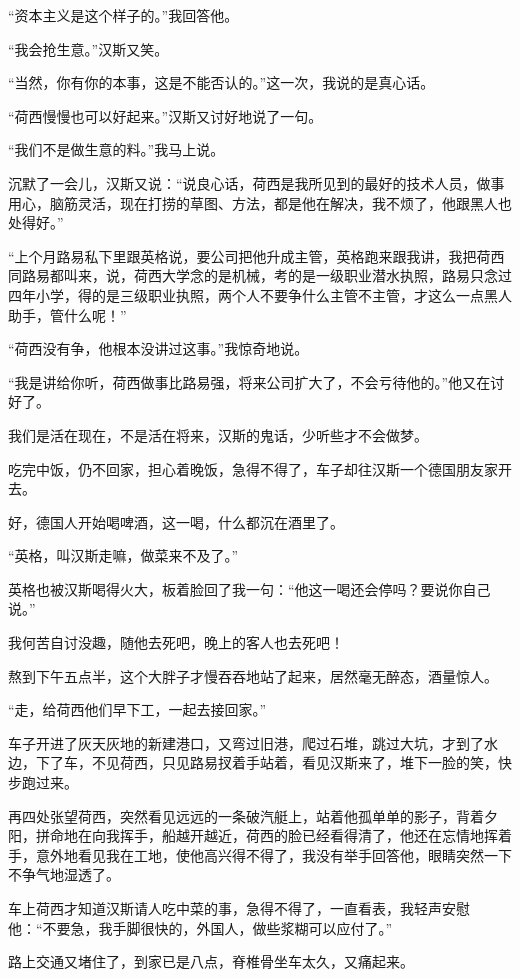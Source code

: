 \par “资本主义是这个样子的。”我回答他。
\par “我会抢生意。”汉斯又笑。
\par “当然，你有你的本事，这是不能否认的。”这一次，我说的是真心话。
\par “荷西慢慢也可以好起来。”汉斯又讨好地说了一句。
\par “我们不是做生意的料。”我马上说。
\par 沉默了一会儿，汉斯又说：“说良心话，荷西是我所见到的最好的技术人员，做事用心，脑筋灵活，现在打捞的草图、方法，都是他在解决，我不烦了，他跟黑人也处得好。”
\par “上个月路易私下里跟英格说，要公司把他升成主管，英格跑来跟我讲，我把荷西同路易都叫来，说，荷西大学念的是机械，考的是一级职业潜水执照，路易只念过四年小学，得的是三级职业执照，两个人不要争什么主管不主管，才这么一点黑人助手，管什么呢！”
\par “荷西没有争，他根本没讲过这事。”我惊奇地说。
\par “我是讲给你听，荷西做事比路易强，将来公司扩大了，不会亏待他的。”他又在讨好了。
\par 我们是活在现在，不是活在将来，汉斯的鬼话，少听些才不会做梦。
\par 吃完中饭，仍不回家，担心着晚饭，急得不得了，车子却往汉斯一个德国朋友家开去。
\par 好，德国人开始喝啤酒，这一喝，什么都沉在酒里了。
\par “英格，叫汉斯走嘛，做菜来不及了。”
\par 英格也被汉斯喝得火大，板着脸回了我一句：“他这一喝还会停吗？要说你自己说。”
\par 我何苦自讨没趣，随他去死吧，晚上的客人也去死吧！
\par 熬到下午五点半，这个大胖子才慢吞吞地站了起来，居然毫无醉态，酒量惊人。
\par “走，给荷西他们早下工，一起去接回家。”
\par 车子开进了灰天灰地的新建港口，又弯过旧港，爬过石堆，跳过大坑，才到了水边，下了车，不见荷西，只见路易扠着手站着，看见汉斯来了，堆下一脸的笑，快步跑过来。
\par 再四处张望荷西，突然看见远远的一条破汽艇上，站着他孤单单的影子，背着夕阳，拼命地在向我挥手，船越开越近，荷西的脸已经看得清了，他还在忘情地挥着手，意外地看见我在工地，使他高兴得不得了，我没有举手回答他，眼睛突然一下不争气地湿透了。
\par 车上荷西才知道汉斯请人吃中菜的事，急得不得了，一直看表，我轻声安慰他：“不要急，我手脚很快的，外国人，做些浆糊可以应付了。”
\par 路上交通又堵住了，到家已是八点，脊椎骨坐车太久，又痛起来。
